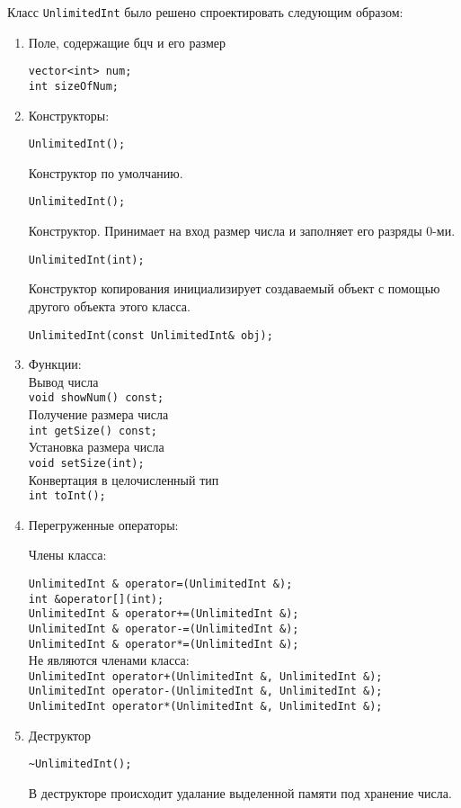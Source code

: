 \documentclass[12pt,a4paper]{report}
\begin{document}
Класс \verb+UnlimitedInt+ было решено спроектировать следующим образом: 
\begin{enumerate}
 	\item Поле, содержащие бцч и его размер
 	
 	\verb+vector<int> num;+\\
    \verb+int sizeOfNum;+	
		 
	\item Конструкторы:
	
	\verb+UnlimitedInt();+

	Конструктор по умолчанию.
	
	\verb+UnlimitedInt();+
	
	Конструктор. Принимает на вход размер числа и заполняет его разряды 0-ми.
	
	\verb+UnlimitedInt(int);+

	Конструктор копирования инициализирует создаваемый объект с помощью другого объекта этого класса.
	
	\verb+UnlimitedInt(const UnlimitedInt& obj);+
	
	\item Функции:\\
	
	Вывод числа\\
	\verb+void showNum() const;+\\
	Получение размера числа\\
    \verb+int getSize() const;+\\
    Установка размера числа\\
    \verb+void setSize(int);+\\
    Конвертация в целочисленный тип\\
    \verb+int toInt();+\\
	
	\item Перегруженные операторы:
	
	Члены класса:
	
	
	\verb+UnlimitedInt & operator=(UnlimitedInt &);+\\
    \verb+int &operator[](int);+\\
    \verb-UnlimitedInt & operator+=(UnlimitedInt &);-\\
    \verb+UnlimitedInt & operator-=(UnlimitedInt &);+\\
    \verb+UnlimitedInt & operator*=(UnlimitedInt &);+\\
    
    Не являются членами класса:\\
    
    \verb-UnlimitedInt operator+(UnlimitedInt &, UnlimitedInt &);-\\
	\verb+UnlimitedInt operator-(UnlimitedInt &, UnlimitedInt &);+\\
	\verb+UnlimitedInt operator*(UnlimitedInt &, UnlimitedInt &);+\\
	
	\item Деструктор	
	
	\verb+~UnlimitedInt();+
	
	В деструкторе происходит удалание выделенной памяти под хранение числа.
	
\end{enumerate}
\end{document}
